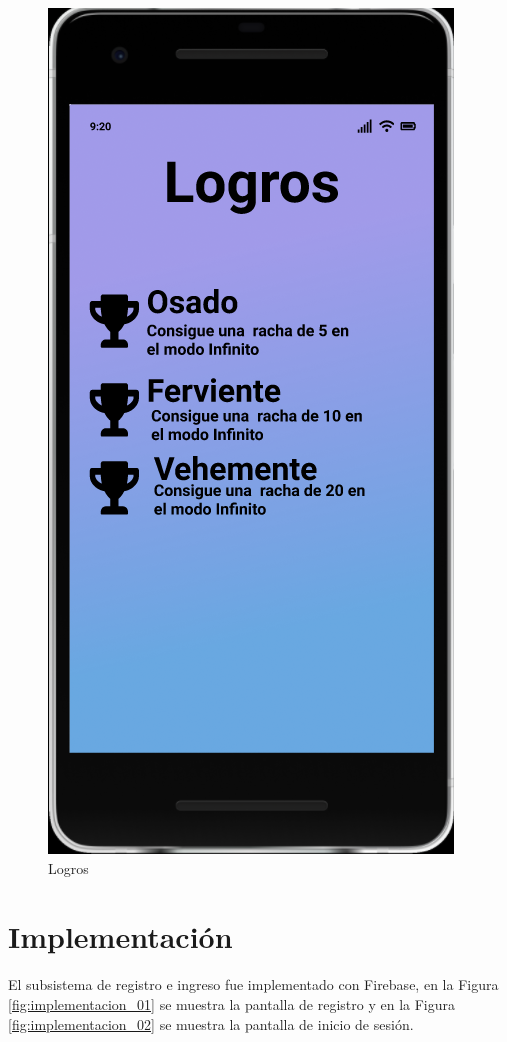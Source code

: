 \documentclass{article}
\begin{document}
\begin{figure}[H]
    \centering
    \includegraphics[scale=0.9]{imgs/Figma/Logros}
    \caption{Logros}
    \label{fig:diseno_10}
\end{figure}

\pagebreak
\section{Implementación}
El subsistema de registro e ingreso fue implementado con Firebase, en la Figura 
\ref{fig:implementacion_01} se muestra la pantalla de registro y en la Figura 
\ref{fig:implementacion_02} se muestra la pantalla de inicio de sesión.
\end{document}
